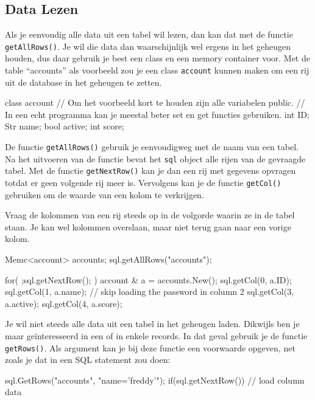 \subsection{Data Lezen}
Als je eenvoudig alle data uit een tabel wil lezen, dan kan dat met de functie \texttt{getAllRows()}. Je wil die data dan waarschijnlijk wel ergens in het geheugen houden, dus daar gebruik je best een class en een memory container voor. Met de table ``accounts'' als voorbeeld zou je een class \texttt{account} kunnen maken om een rij uit de database in het geheugen te zetten.

\begin{code}
class account {
  // Om het voorbeeld kort te houden zijn alle variabelen public.
	// In een echt programma kan je meestal beter set en get functies gebruiken.
	int ID;
	Str name;
	bool active;
	int score;
}
\end{code}

De functie \texttt{getAllRows()} gebruik je eenvoudigweg met de naam van een tabel. Na het uitvoeren van de functie bevat het \texttt{sql} object alle rijen van de gevraagde tabel. Met de functie \texttt{getNextRow()} kan je dan een rij met gegevens opvragen totdat er geen volgende rij meer is. Vervolgens kan je de functie \texttt{getCol()} gebruiken om de waarde van een kolom te verkrijgen. 

\begin{note}
Vraag de kolommen van een rij steeds op in de volgorde waarin ze in de tabel staan. Je kan wel kolommen overslaan, maar niet terug gaan naar een vorige kolom.
\end{note}

\begin{code}
Memc<account> accounts;
sql.getAllRows("accounts");

for( ;sql.getNextRow(); ) {
  account & a = accounts.New();
	sql.getCol(0, a.ID);
	sql.getCol(1, a.name);
	// skip loading the password in column 2
	sql.getCol(3, a.active);
	sql.getCol(4, a.score);
}
\end{code}

Je wil niet steeds alle data uit een tabel in het geheugen laden. Dikwijls ben je maar ge\"interesseerd in een of in enkele records. In dat geval gebruik je de functie \texttt{getRows()}. Als argument kan je bij deze functie een voorwaarde opgeven, net zoals je dat in een SQL statement zou doen:

\begin{code}
sql.GetRows("accounts", "name='freddy'");
if(sql.getNextRow()) {
	// load column data
}
\end{code}

